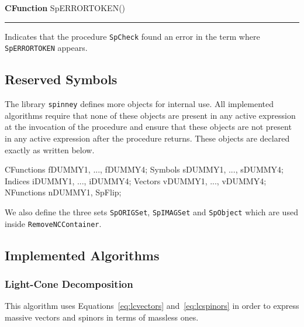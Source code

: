 \documentclass[preprint,number,12pt,sort&compress]{elsarticle}
\newlength{\funcindent}
\newlength{\funcwidth}
\newenvironment{Ventry}[1]%
 {\begin{list}{}{%
   \renewcommand{\makelabel}[1]{\texttt{##1:}\hfil}%
   \settowidth{\labelwidth}{\texttt{#1:}}%
   \setlength{\leftmargin}{\labelsep}%
   \addtolength{\leftmargin}{\labelwidth}}}%
 {\end{list}}
\newenvironment{CFunction}[2]{%
\hspace{.8\funcindent}\begin{boxedminipage}{\funcwidth}
	\raggedright \textbf{CFunction} #1(#2)

	\vspace{-1.5ex}

	\rule{\textwidth}{0.5\fboxrule}
	\setlength{\parskip}{2ex}
}{\end{boxedminipage}}
\newenvironment{Also}{%
	\setlength{\parskip}{1ex}
	\textbf{See also}
	\vspace{-1ex}
	\begin{quote}}{%
	\end{quote}}
\begin{document}
\medskip
\begin{CFunction}{SpERRORTOKEN}{}
   Indicates that the procedure \texttt{SpCheck} found an error
	in the term where \texttt{SpERRORTOKEN} appears.

\end{CFunction}

\subsection{Reserved Symbols}
The library \texttt{spinney} defines more objects for internal use.
All implemented algorithms require that none of these objects are
present in any active expression at the invocation of the procedure and
ensure that these objects are not present in any active expression after
the procedure returns. These objects are declared exactly as written below.
\begin{spform}
CFunctions fDUMMY1, ..., fDUMMY4;
Symbols sDUMMY1, ..., sDUMMY4;
Indices iDUMMY1, ..., iDUMMY4;
Vectors vDUMMY1, ..., vDUMMY4;
NFunctions nDUMMY1, SpFlip;
\end{spform}
We also define the three sets \texttt{SpORIGSet}, \texttt{SpIMAGSet}
and \texttt{SpObject} which are used inside \texttt{RemoveNCContainer}.

\subsection{Implemented Algorithms}

\subsubsection{Light-Cone Decomposition}
This algorithm uses Equations~\eqref{eq:lcvectors}
and~\eqref{eq:lcspinors} in order to express massive
vectors and spinors in terms of massless ones.
\end{document}
